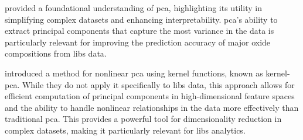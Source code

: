 \citet{woldPrincipalComponentAnalysis1987} provided a foundational understanding of \gls{pca}, highlighting its utility in simplifying complex datasets and enhancing interpretability.
\gls{pca}'s ability to extract principal components that capture the most variance in the data is particularly relevant for improving the prediction accuracy of major oxide compositions from \gls{libs} data.

\citet{scholkopftKPCA} introduced a method for nonlinear \gls{pca} using kernel functions, known as \gls{kernel-pca}.
While they do not apply it specifically to \gls{libs} data, this approach allows for efficient computation of principal components in high-dimensional feature spaces and the ability to handle nonlinear relationships in the data more effectively than traditional \gls{pca}.
This provides a powerful tool for dimensionality reduction in complex datasets, making it particularly relevant for \gls{libs} analytics.




